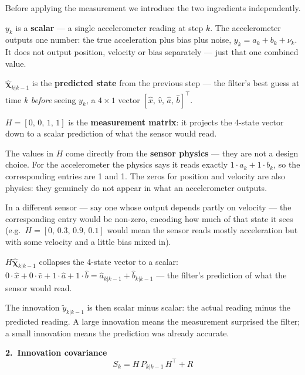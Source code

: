 \documentclass[12pt, a4paper]{article}
\begin{document}
Before applying the measurement we introduce the two ingredients
independently.

$y_k$ is a \textbf{scalar} --- a single accelerometer reading at step $k$.
The accelerometer outputs one number: the true acceleration plus bias plus
noise, $y_k = a_k + b_k + \nu_k$.
It does not output position, velocity or bias separately --- just that
one combined value.

$\hat{\boldsymbol{\chi}}_{k|k-1}$ is the \textbf{predicted state} from the
previous step --- the filter's best guess at time $k$ \emph{before}
seeing $y_k$, a $4\times1$ vector $[\hat{x},\,\hat{v},\,\hat{a},\,\hat{b}]^\top$.

$H = [0,\,0,\,1,\,1]$ is the \textbf{measurement matrix}: it projects
the 4-state vector down to a scalar prediction of what the sensor
would read.
\begin{notebox}
The values in $H$ come directly from the \textbf{sensor physics} ---
they are not a design choice.
For the accelerometer the physics says it reads exactly
$1{\cdot}a_k + 1{\cdot}b_k$, so the corresponding entries are 1 and 1.
The zeros for position and velocity are also physics: they genuinely
do not appear in what an accelerometer outputs.

In a different sensor --- say one whose output depends partly on velocity
--- the corresponding entry would be non-zero, encoding how much of that
state it sees (e.g.\ $H = [0,\,0.3,\,0.9,\,0.1]$ would mean the sensor
reads mostly acceleration but with some velocity and a little bias mixed in).

$H\hat{\boldsymbol{\chi}}_{k|k-1}$ collapses the 4-state vector to a scalar:
$0{\cdot}\hat{x} + 0{\cdot}\hat{v} + 1{\cdot}\hat{a} + 1{\cdot}\hat{b}
= \hat{a}_{k|k-1} + \hat{b}_{k|k-1}$ ---
the filter's prediction of what the sensor would read.
\end{notebox}

The innovation $\tilde{y}_{k|k-1}$ is then scalar minus scalar:
the actual reading minus the predicted reading.
A large innovation means the measurement surprised the filter;
a small innovation means the prediction was already accurate.

\medskip
\textbf{2.\ Innovation covariance}
\[
  S_k = H\,P_{k|k-1}\,H^\top + R
\]
\end{document}
